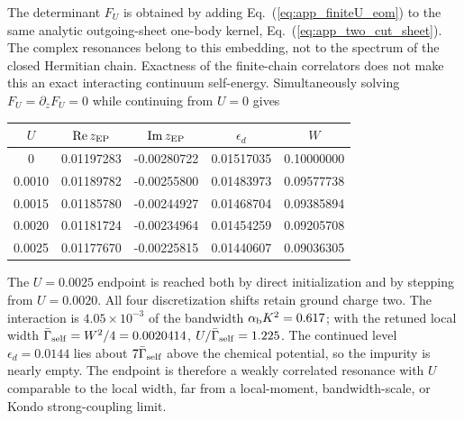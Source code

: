 \documentclass[%
  aps,physrev,onecolumn,10pt,amsmath,amssymb,superscriptaddress,longbibliography,floatfix
]{revtex4-2}
\begin{document}
The determinant \(F_U\) is obtained by adding Eq.~(\ref{eq:app_finiteU_eom})
to the same analytic outgoing-sheet one-body kernel,
Eq.~(\ref{eq:app_two_cut_sheet}).  The complex resonances belong to this
embedding, not to the spectrum of the closed Hermitian chain.  Exactness of
the finite-chain correlators does not make this an exact interacting
continuum self-energy.  Simultaneously solving
\(F_U=\partial_zF_U=0\) while continuing from \(U=0\) gives
\begin{center}
\begin{tabular}{@{}ccccc@{}}
\toprule
\(U\) & \(\operatorname{Re}z_{\rm EP}\) &
\(\operatorname{Im}z_{\rm EP}\) & \(\epsilon_d\) & \(W\)\\
\midrule
0      & 0.01197283 & -0.00280722 & 0.01517035 & 0.10000000\\
0.0010 & 0.01189782 & -0.00255800 & 0.01483973 & 0.09577738\\
0.0015 & 0.01185780 & -0.00244927 & 0.01468704 & 0.09385894\\
0.0020 & 0.01181724 & -0.00234964 & 0.01454259 & 0.09205708\\
0.0025 & 0.01177670 & -0.00225815 & 0.01440607 & 0.09036305\\
\bottomrule
\end{tabular}
\end{center}
The \(U=0.0025\) endpoint is reached both by direct initialization and by
stepping from \(U=0.0020\).  All four discretization shifts retain ground
charge two.  The interaction is $4.05\times10^{-3}$ of the bandwidth
$\alpha_{\rm b}K^2=0.617$; with the retuned local width
\(\bar\Gamma_{\rm self}=W^2/4=0.0020414\),
\(U/\bar\Gamma_{\rm self}=1.225\).  The continued level
$\epsilon_d=0.0144$ lies about $7\bar\Gamma_{\rm self}$ above the chemical
potential, so the impurity is nearly empty.  The endpoint is therefore a
weakly correlated resonance with $U$ comparable to the local width, far from
a local-moment, bandwidth-scale, or Kondo strong-coupling limit.
\end{document}
